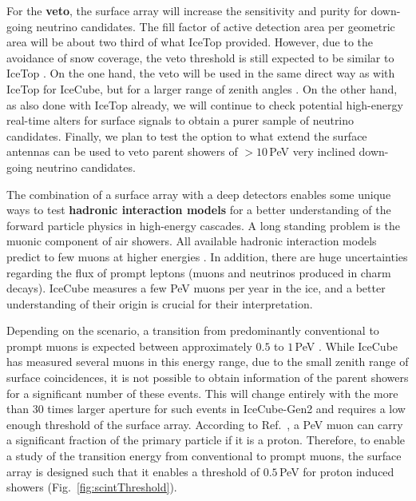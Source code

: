\documentclass[a4paper,11pt]{article}
\begin{document}
For the \textbf{veto}, the surface array will increase the sensitivity and purity for down-going neutrino candidates. 
The fill factor of active detection area per geometric area will be about two third of what IceTop provided. 
However, due to the avoidance of snow coverage, the veto threshold is still expected to be similar to IceTop \cite{Gen2surfaceSims_ICRC2021}. On the one hand, the veto will be used in the same direct way as with IceTop for IceCube, but for a larger range of zenith angles \cite{Aartsen:2016oji}. 
On the other hand, as also done with IceTop already, we will continue to check potential high-energy real-time alters for surface signals to obtain a purer sample of neutrino candidates. 
Finally, we plan to test the option to what extend the surface antennas can be used to veto parent showers of $> 10\,$PeV very inclined down-going neutrino candidates.

The combination of a surface array with a deep detectors enables some unique ways to test \textbf{hadronic interaction models} for a better understanding of the forward particle physics in high-energy cascades.
A long standing problem is the muonic component of air showers. 
All available hadronic interaction models predict to few muons at higher energies \cite{Cazon:2019ud}. 
In addition, there are huge uncertainties regarding the flux of prompt leptons (muons and neutrinos produced in charm decays).
IceCube measures a few PeV muons per year in the ice, and a better understanding of their origin is crucial for their interpretation.

Depending on the scenario, a transition from predominantly conventional to prompt muons is expected between approximately $0.5$ to $1\,$PeV \cite{Aartsen:2015nss}.
While IceCube has measured several muons in this energy range, due to the small zenith range of surface coincidences, it is not possible to obtain information of the parent showers for a significant number of these events. 
This will change entirely with the more than 30 times larger aperture for such events in IceCube-Gen2 and requires a low enough threshold of the surface array. 
According to Ref.~\cite{Fedynitch:2018cbl}, a PeV muon can carry a significant fraction of the primary particle if it is a proton. 
Therefore, to enable a study of the transition energy from conventional to prompt muons, the surface array is designed such that it enables a threshold of $0.5\,$PeV for proton induced showers (Fig.~\ref{fig:scintThreshold}).
\end{document}
